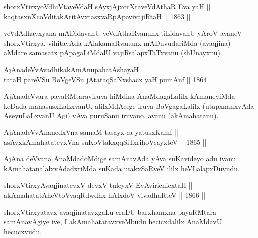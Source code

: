 
\begin{shl}
shorxVtirxyoV\s dhiVtaveVdaH sAyxjAjxcnXtaveVdAthaR Eva yaH || \\
kaqtasxnXcoVditakAritAvxtasxvaRpApavivajiRtaH \hfill || 1863 ||
  
\end{shl}

\begin{artha}
veVdAdhayxyana mADidavanU veVdAthaRvanunx tiLidavanU yAroV avaneV
shorxVtirxya, vihitavAda kAlakamaRvanunx mADuvudariMda (avaqjina)
aMdare samasatx pApagaLiMdalU vajiRsalapxTaTxvanu (shUnayxnu).
\end{artha}


\begin{shl}
AjAnadeVvAvadhikakAmAnupahatAshayaH || \\
tataH pareVSu BoVgeVSu jAtataqSaNxshacx yaH pumAnf \hfill || 1864 ||
  
\end{shl}

\begin{artha}
AjAnadeVvara payaRMtaraviruva hiMdina AnaMdagaLalilx kAmaneyiMda
keDada manasusxLaLxvanU, alilxMdAcege iruva BoVgagaLalilx
(utapxnanxvAda AseyuLaLxvanU Agi) yAva puruSanu iruvano, avanu
(akAmahatanu).
\end{artha}

\begin{shl}
AjAnadeVvAnanedxVna samaM tasayx ca yatusxKamf ||  \\
asAyxkAmahatatevxVna suKoVtakxqqSiTxrihoVcayxteV \hfill || 1865 ||
  
\end{shl}

\begin{artha}
AjAna deVvana AnaMdadoMdige samAnavAda yAva suKavideyo adu ivanu
kAmahatanalalxvAdadxriMda suKada utakxSaRveV ililx heVLalapxDuvudu.
\end{artha}

\begin{shl}
shorxVtirxyAvaqjinatevxV devxV tuleyxV EvA\s \s viricnicxtaH || \\
akAmahatatAheVtoVvaqRdwdhx hAlxdoV vivadhaRteV \hfill || 1866 ||
  
\end{shl}

\begin{artha}
shorxVtirxyatavx avaqjinatavxgaLu eraDU barxhamxna payaRMtara
samAnavAgiye ive, I akAmahatatavxveMbudu hecicxdalilx AnaMdavU
hecucxvudu.
\end{artha}

